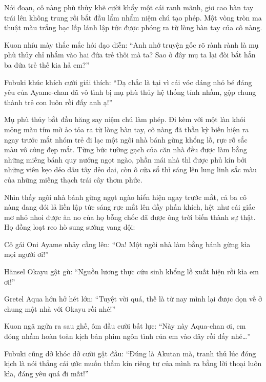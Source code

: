 \documentclass[../main.tex]{subfiles}
\begin{document}
Nói đoạn, cô nàng phù thủy khẽ cười khẩy một cái ranh mãnh, giơ cao bàn tay trái lên không trung rồi bắt đầu lẩm nhẩm niệm chú tạo phép. Một vòng tròn ma thuật màu trắng bạc lấp lánh lập tức được phóng ra từ lòng bàn tay của cô nàng.


\il

Kuon nhíu mày thắc mắc hỏi đạo diễn: ``Anh nhớ truyện gốc rõ rành rành là mụ phù thủy chỉ nhắm vào hai đứa trẻ thôi mà ta? Sao ở đây mụ ta lại đòi bắt hẳn ba đứa trẻ thế kia hả em?''

Fubuki khúc khích cười giải thích: ``Dạ chắc là tại vì cái vóc dáng nhỏ bé đáng yêu của Ayame-chan đã vô tình bị mụ phù thủy hệ thống tính nhầm, gộp chung thành trẻ con luôn rồi đấy anh ạ!''

\il

Mụ phù thủy bắt đầu hăng say niệm chú làm phép. Đi kèm với một làn khói mỏng màu tím mờ ảo tỏa ra từ lòng bàn tay, cô nàng đã thần kỳ biến hiện ra ngay trước mắt nhóm trẻ đi lạc một ngôi nhà bánh gừng khổng lồ, rực rỡ sắc màu vô cùng đẹp mắt. Từng bức tường gạch của căn nhà đều được làm bằng những miếng bánh quy nướng ngọt ngào, phần mái nhà thì được phủ kín bởi những viên kẹo dẻo dâu tây dẻo dai, còn ô cửa sổ thì sáng lên lung linh sắc màu của những miếng thạch trái cây thơm phức.


Nhìn thấy ngôi nhà bánh gừng ngọt ngào hiển hiện ngay trước mắt, cả ba cô nàng đang đói lả liền lập tức sáng rực mắt lên đầy phấn khích, hệt như cái giấc mơ nhỏ nhoi được ăn no của họ bỗng chốc đã được ông trời biến thành sự thật. Họ đồng loạt reo hò sung sướng vang dội:

Cô gái Oni Ayame nhảy cẫng lên: ``Oa! Một ngôi nhà làm bằng bánh gừng kìa mọi người ơi!''

Hänsel Okayu gật gù: ``Nguồn lương thực cứu sinh khổng lồ xuất hiện rồi kìa em ơi!''

Gretel Aqua hớn hở hét lớn: ``Tuyệt vời quá, thế là từ nay mình lại được dọn về ở chung một nhà với Okayu rồi nhé!''

\il

Kuon ngã ngửa ra sau ghế, ôm đầu cười bất lực: ``Này này Aqua-chan ơi, em đóng nhầm hoàn toàn kịch bản phim ngôn tình của em vào đây rồi đấy nhé\dots''

Fubuki cũng dở khóc dở cười gật đầu: ``Đúng là Akutan mà, tranh thủ lúc đóng kịch là nói thẳng cái ước muốn thầm kín riêng tư của mình ra bằng lời thoại luôn kìa, đáng yêu quá đi mất!''
\end{document}
